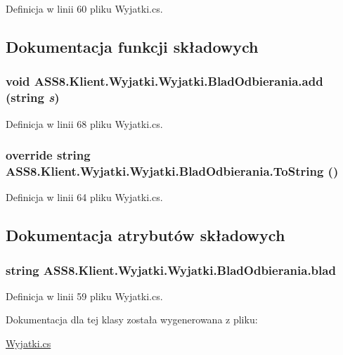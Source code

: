 Definicja w linii 60 pliku Wyjatki.cs.

\subsection{Dokumentacja funkcji składowych}
\hypertarget{a00032_03d1694a467256c129054ac47a6971a9}{
\subsubsection[{add}]{\setlength{\rightskip}{0pt plus 5cm}void ASS8.Klient.Wyjatki.Wyjatki.BladOdbierania.add (string {\em s})}}
\label{dc/d87/a00032_03d1694a467256c129054ac47a6971a9}




Definicja w linii 68 pliku Wyjatki.cs.\hypertarget{a00032_889290a65d2d550ce1a6ea3b58d77245}{
\subsubsection[{ToString}]{\setlength{\rightskip}{0pt plus 5cm}override string ASS8.Klient.Wyjatki.Wyjatki.BladOdbierania.ToString ()}}
\label{dc/d87/a00032_889290a65d2d550ce1a6ea3b58d77245}




Definicja w linii 64 pliku Wyjatki.cs.

\subsection{Dokumentacja atrybutów składowych}
\hypertarget{a00032_cbb5d38fe623410f76972845d467e8d9}{
\subsubsection[{blad}]{\setlength{\rightskip}{0pt plus 5cm}string ASS8.Klient.Wyjatki.Wyjatki.BladOdbierania.blad}}
\label{dc/d87/a00032_cbb5d38fe623410f76972845d467e8d9}




Definicja w linii 59 pliku Wyjatki.cs.

Dokumentacja dla tej klasy została wygenerowana z pliku:\begin{CompactItemize}
\item 
\hyperlink{a00053}{Wyjatki.cs}\end{CompactItemize}
